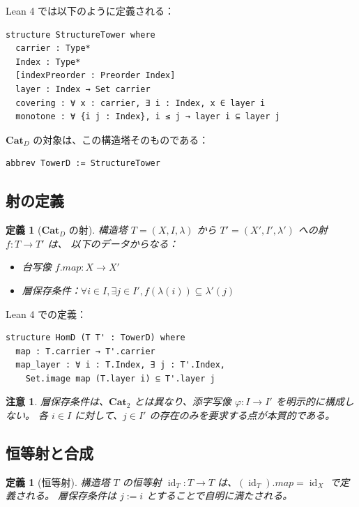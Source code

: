 \documentclass[a4paper,12pt]{ltjsarticle}
\newtheorem{definition}[theorem]{定義}
\newtheorem{remark}[theorem]{注意}
\DeclareMathOperator{\id}{id}
\begin{document}
Lean 4 では以下のように定義される：

\begin{verbatim}
structure StructureTower where
  carrier : Type*
  Index : Type*
  [indexPreorder : Preorder Index]
  layer : Index → Set carrier
  covering : ∀ x : carrier, ∃ i : Index, x ∈ layer i
  monotone : ∀ {i j : Index}, i ≤ j → layer i ⊆ layer j
\end{verbatim}

$\mathbf{Cat}_D$ の対象は、この構造塔そのものである：
\begin{verbatim}
abbrev TowerD := StructureTower
\end{verbatim}

\subsection{射の定義}

\begin{definition}[$\mathbf{Cat}_D$ の射]
\label{def:hom}
構造塔 $T = (X, I, \lambda)$ から $T' = (X', I', \lambda')$ への射 $f: T \to T'$ は、
以下のデータからなる：
\begin{itemize}
  \item 台写像 $f.map: X \to X'$
  \item 層保存条件：$\forall i \in I, \exists j \in I', f({\lambda(i)}) \subseteq \lambda'(j)$
\end{itemize}
\end{definition}

Lean 4 での定義：

\begin{verbatim}
structure HomD (T T' : TowerD) where
  map : T.carrier → T'.carrier
  map_layer : ∀ i : T.Index, ∃ j : T'.Index,
    Set.image map (T.layer i) ⊆ T'.layer j
\end{verbatim}

\begin{remark}
層保存条件は、$\mathbf{Cat}_2$ とは異なり、添字写像 $\varphi: I \to I'$ を明示的に構成しない。
各 $i \in I$ に対して、$j \in I'$ の存在のみを要求する点が本質的である。
\end{remark}

\subsection{恒等射と合成}

\begin{definition}[恒等射]
構造塔 $T$ の恒等射 $\id_T: T \to T$ は、$(\id_T).map = \id_X$ で定義される。
層保存条件は $j := i$ とすることで自明に満たされる。
\end{definition}
\end{document}
